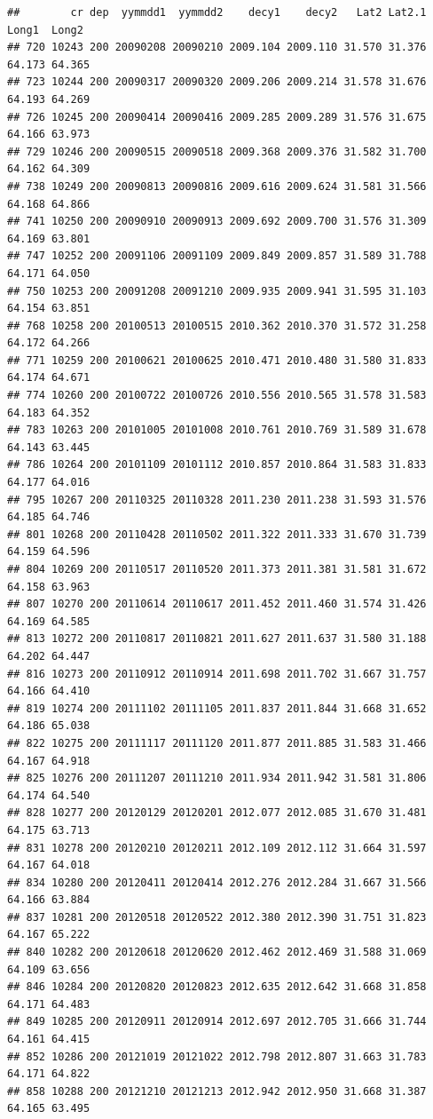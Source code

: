 \documentclass[]{article}
\begin{document}
\begin{verbatim}
##        cr dep  yymmdd1  yymmdd2    decy1    decy2   Lat2 Lat2.1  Long1  Long2
## 720 10243 200 20090208 20090210 2009.104 2009.110 31.570 31.376 64.173 64.365
## 723 10244 200 20090317 20090320 2009.206 2009.214 31.578 31.676 64.193 64.269
## 726 10245 200 20090414 20090416 2009.285 2009.289 31.576 31.675 64.166 63.973
## 729 10246 200 20090515 20090518 2009.368 2009.376 31.582 31.700 64.162 64.309
## 738 10249 200 20090813 20090816 2009.616 2009.624 31.581 31.566 64.168 64.866
## 741 10250 200 20090910 20090913 2009.692 2009.700 31.576 31.309 64.169 63.801
## 747 10252 200 20091106 20091109 2009.849 2009.857 31.589 31.788 64.171 64.050
## 750 10253 200 20091208 20091210 2009.935 2009.941 31.595 31.103 64.154 63.851
## 768 10258 200 20100513 20100515 2010.362 2010.370 31.572 31.258 64.172 64.266
## 771 10259 200 20100621 20100625 2010.471 2010.480 31.580 31.833 64.174 64.671
## 774 10260 200 20100722 20100726 2010.556 2010.565 31.578 31.583 64.183 64.352
## 783 10263 200 20101005 20101008 2010.761 2010.769 31.589 31.678 64.143 63.445
## 786 10264 200 20101109 20101112 2010.857 2010.864 31.583 31.833 64.177 64.016
## 795 10267 200 20110325 20110328 2011.230 2011.238 31.593 31.576 64.185 64.746
## 801 10268 200 20110428 20110502 2011.322 2011.333 31.670 31.739 64.159 64.596
## 804 10269 200 20110517 20110520 2011.373 2011.381 31.581 31.672 64.158 63.963
## 807 10270 200 20110614 20110617 2011.452 2011.460 31.574 31.426 64.169 64.585
## 813 10272 200 20110817 20110821 2011.627 2011.637 31.580 31.188 64.202 64.447
## 816 10273 200 20110912 20110914 2011.698 2011.702 31.667 31.757 64.166 64.410
## 819 10274 200 20111102 20111105 2011.837 2011.844 31.668 31.652 64.186 65.038
## 822 10275 200 20111117 20111120 2011.877 2011.885 31.583 31.466 64.167 64.918
## 825 10276 200 20111207 20111210 2011.934 2011.942 31.581 31.806 64.174 64.540
## 828 10277 200 20120129 20120201 2012.077 2012.085 31.670 31.481 64.175 63.713
## 831 10278 200 20120210 20120211 2012.109 2012.112 31.664 31.597 64.167 64.018
## 834 10280 200 20120411 20120414 2012.276 2012.284 31.667 31.566 64.166 63.884
## 837 10281 200 20120518 20120522 2012.380 2012.390 31.751 31.823 64.167 65.222
## 840 10282 200 20120618 20120620 2012.462 2012.469 31.588 31.069 64.109 63.656
## 846 10284 200 20120820 20120823 2012.635 2012.642 31.668 31.858 64.171 64.483
## 849 10285 200 20120911 20120914 2012.697 2012.705 31.666 31.744 64.161 64.415
## 852 10286 200 20121019 20121022 2012.798 2012.807 31.663 31.783 64.171 64.822
## 858 10288 200 20121210 20121213 2012.942 2012.950 31.668 31.387 64.165 63.495

\end{verbatim}
\end{document}
